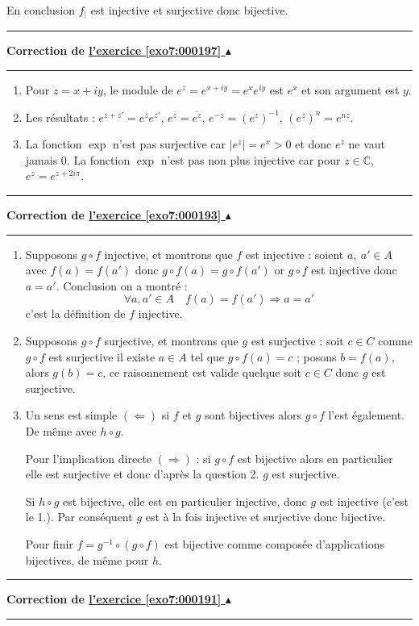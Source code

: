 \documentclass[11pt,a4paper]{article}
\newcommand{\Cc}{\mathbb{C}} \newcommand{\C}{\mathbb{C}}
\newcounter{exo}
\newcommand{\correction}[1]{\hypertarget{cor7:#1}{}\label{cor7:#1}{\bf Correction de \hyperlink{exo7:#1}{l'exercice \ref{exo7:#1} $\blacktriangle$}}\vspace{1mm}\hrule\vspace{1mm}}
\newcommand{\fincorrection}{\vspace{1mm}\hrule\vspace*{7mm}}
\begin{document}
En conclusion $f_|$ est injective et surjective donc bijective.
\fincorrection
\correction{000197}
\begin{enumerate}
     \item Pour $z=x+iy$, le  module de $e^z=e^{x+iy}=e^xe^{iy}$ est $e^x$ et
son argument est $y$.
    \item Les r\'esultats : $e^{z+z'} = e^ze^{z'}$, $e^{\overline{z}} =
\overline{e^z}$, $e^{-z}= \left( e^{z} \right)^{-1}$,
$(e^z)^n=e^{nz}$.
    \item La fonction $\exp$ n'est pas surjective car $|e^z| = e^x >0$ et
donc $e^z$ ne vaut jamais $0$. La fonction $\exp$ n'est pas non
plus injective car pour $z\in\Cc$, $e^z=e^{z+2i\pi}$.
\end{enumerate}
\fincorrection
\correction{000193}
\begin{enumerate}
\item Supposons $g\circ f$ injective, et montrons que $f$ est injective :
soient $a,\ a' \in A$ avec $f(a)=f(a')$ donc $g\circ f(a)=g\circ
f(a')$ or $g\circ f$ est injective donc $a= a'$. Conclusion on a
montr\'e : $$\forall a,a'  \in A \quad  f(a)=f(a') \Rightarrow
a=a'$$ c'est la d\'efinition de $f$ injective.

\item Supposons $g\circ f$ surjective, et montrons que $g$ est surjective :
soit $c \in C$ comme $g\circ f$ est surjective il existe $a \in A$
tel que  $g\circ f(a)=c$ ; posons $b = f(a)$, alors $g(b)=c$, ce
raisonnement est valide quelque soit $c \in C$ donc $g$ est
surjective.

\item  Un sens est simple $(\Leftarrow)$ si $f$ et $g$ sont bijectives alors $g\circ f$ l'est \'egalement. De m\^eme avec $h\circ g$.

\par

Pour l'implication directe $(\Rightarrow)$ : si $g\circ f$ est
bijective alors en particulier elle est surjective et donc
d'apr\`es la question 2. $g$ est surjective.

 Si $h\circ g$ est bijective, elle est en particulier  injective, donc $g$ est injective (c'est le 1.). Par cons\'equent $g$ est \`a la fois injective et
surjective donc bijective.

 Pour finir $f=g^{-1} \circ (g\circ f)$ est bijective comme compos\'ee d'applications bijectives, de m\^eme pour $h$.

\end{enumerate}
\fincorrection
\correction{000191}
\end{document}
